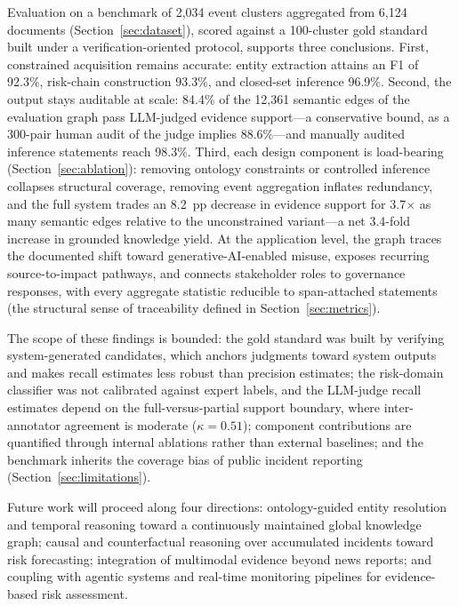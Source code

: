 \documentclass[a4paper,fleqn]{cas-dc}
\begin{document}
Evaluation on a benchmark of 2{,}034 event clusters aggregated from
6{,}124 documents (Section~\ref{sec:dataset}), scored against a
100-cluster gold standard built under a verification-oriented
protocol, supports three conclusions.
First, constrained acquisition remains accurate: entity extraction
attains an F1 of 92.3\%, risk-chain construction 93.3\%, and
closed-set inference 96.9\%.
Second, the output stays auditable at scale: 84.4\% of the 12{,}361
semantic edges of the evaluation graph pass LLM-judged evidence
support---a conservative bound, as a 300-pair human audit of the
judge implies 88.6\%---and manually audited inference statements
reach 98.3\%.
Third, each design component is load-bearing
(Section~\ref{sec:ablation}): removing ontology constraints or
controlled inference collapses structural coverage, removing event
aggregation inflates redundancy, and the full system trades an
8.2~pp decrease in evidence support for 3.7$\times$ as many semantic
edges relative to the unconstrained variant---a net 3.4-fold increase
in grounded knowledge yield.
At the application level, the graph traces the documented shift toward
generative-AI-enabled misuse, exposes recurring source-to-impact
pathways, and connects stakeholder roles to governance responses, with
every aggregate statistic reducible to span-attached statements
(the structural sense of traceability defined in
Section~\ref{sec:metrics}).

The scope of these findings is bounded: the gold standard was built by
verifying system-generated candidates, which anchors judgments toward
system outputs and makes recall estimates less robust than precision
estimates; the risk-domain classifier was not calibrated against
expert labels, and the LLM-judge recall estimates depend on the
full-versus-partial support boundary, where inter-annotator agreement
is moderate ($\kappa = 0.51$);
component contributions are
quantified through internal ablations rather than external baselines;
and the benchmark inherits the coverage bias of public incident
reporting (Section~\ref{sec:limitations}).

Future work will proceed along four directions: ontology-guided entity
resolution and temporal reasoning toward a continuously maintained
global knowledge graph; causal and counterfactual reasoning over
accumulated incidents toward risk forecasting; integration of
multimodal evidence beyond news reports; and coupling with agentic
systems and real-time monitoring pipelines for evidence-based risk
assessment.

\end{document}
